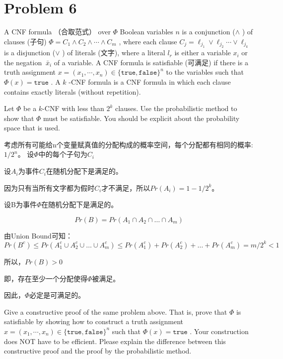 \documentclass[12pt, a4paper, oneside]{ctexart}
\begin{document}
\section*{Problem 6}
A CNF formula （合取范式）
over $ \Phi $
Boolean variables $n$
is a conjunction ($\wedge$
) of clauses (子句) $ \Phi=C_1\land C_2\land\cdots\land C_m $
, where each clause $C_j=\ell_{j_1}\lor\ell_{j_2}\cdots\lor\ell_{j_k} $
is a disjunction ($\vee $
) of literals (文字), where a literal $l_r$
is either a variable $x_i$
or the negation $\ \bar{x}_i $
of a variable. A CNF formula is satisfiable (可满足) if there is a truth assignment $\displaystyle{ x=(x_1,\cdots, x_n)\in \{\mathtt{true},\mathtt{false}\}^n }$
to the variables such that $\displaystyle{ \Phi(x)=\mathtt{true} }$
. A $k$
-CNF formula is a CNF formula in which each clause contains exactly
literals (without repetition).
\begin{problem}
[Satisfiability (I)] Let $\Phi$
be a $k$-CNF with less than $2^k$
clauses. Use the probabilistic method to show that $\Phi$
must be satisfiable. You should be explicit about the probability space that is used.
\end{problem}
\begin{solution}
  考虑所有可能给n个变量赋真值的分配构成的概率空间，每个分配都有相同的概率:$1/2^n$。
  设$\Phi$中的每个子句为$C_i$

  设$A_i$为事件$C_i$在随机分配下是满足的。

  因为只有当所有文字都为假时$C_i$才不满足，所以$Pr(A_i) = 1 - 1/2^k$。

  设B为事件$\Phi$在随机分配下是满足的。

  $$Pr(B) = Pr(A_1 \cap A_2 \cap … \cap A_m)$$

  由Union Bound可知：
  $$Pr(B^c) \leq Pr(A_1^c \cup A_2^c \cup … \cup A_m^c) \leq Pr(A_1^c) + Pr(A_2^c) + … + Pr(A_m^c) = m/2^k < 1$$

  所以，$Pr(B) > 0$

  即，存在至少一个分配使得$\Phi$被满足。

  因此，$\Phi$必定是可满足的。
\end{solution}
\begin{problem}
[Satisfiability (II)] Give a constructive proof of the same problem above. That is, prove that $\Phi$
is satisfiable by showing how to construct a truth assignment $\displaystyle{ x=(x_1,\cdots, x_n)\in \{\mathtt{true},\mathtt{false}\}^n }$
such that $\displaystyle{ \Phi(x)=\mathtt{true} }$
. Your construction does NOT have to be efficient. Please explain the difference between this constructive proof and the proof by the probabilistic method.
\end{problem}
\end{document}
